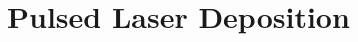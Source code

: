 \documentclass[12pt]{book}
\begin{document}
%         
        
%         
%             
%             

%         

    \section{Pulsed Laser Deposition}
        


\newpage
\sloppy %
\printbibliography
\end{document}
